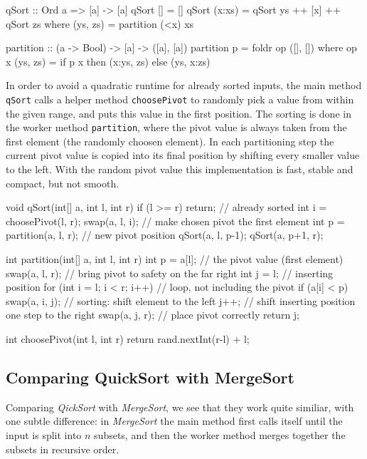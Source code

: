 \begin{haskellcode}
qSort :: Ord a => [a] -> [a]
qSort [] = []
qSort (x:xs) = qSort ys ++ [x] ++ qSort zs
    where (ys, zs) = partition (<x) xs

partition :: (a -> Bool) -> [a] -> ([a], [a])
partition p = foldr op ([], [])
    where op x (ys, zs) = if p x then (x:ys, zs) else (ys, x:zs)
\end{haskellcode}

\begin{impl}
In order to avoid a quadratic runtime for already sorted inputs, the main method \texttt{qSort} calls a helper method \texttt{choosePivot} to randomly pick a value from within the given range, and puts this value in the first position.
The sorting is done in the worker method \texttt{partition}, where the pivot value is always taken from the first element (the randomly choosen element).
In each partitioning step the current pivot value is copied into its final position by shifting every smaller value to the left. With the random pivot value this implementation is fast, stable and compact, but not smooth.
\end{impl}

\begin{javacode}
void qSort(int[] a, int l, int r) {
    if (l >= r) return; // already sorted
    int i = choosePivot(l, r);
    swap(a, l, i); // make chosen pivot the first element
    int p = partition(a, l, r); // new pivot position
    qSort(a, l, p-1);
    qSort(a, p+1, r);
}

int partition(int[] a, int l, int r) {
    int p = a[l]; // the pivot value (first element)
    swap(a, l, r); // bring pivot to safety on the far right
    int j = l; // inserting position
    for (int i = l; i < r; i++) { // loop, not including the pivot
        if (a[i] < p) {
            swap(a, i, j); // sorting: shift element to the left
            j++; // shift inserting position one step to the right
        }
    }
    swap(a, j, r); // place pivot correctly
    return j;
}

int choosePivot(int l, int r) {
    return rand.nextInt(r-l) + l;
}
\end{javacode}

\subsection{Comparing QuickSort with MergeSort}

Comparing \emph{QickSort} with \emph{MergeSort}, we see that they work quite similiar, with one subtle difference:
in \emph{MergeSort} the main method first calls itself until the input is split into $n$ subsets, and then the worker method merges together the subsets in recursive order.

